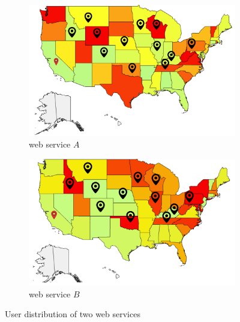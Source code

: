 \begin{figure}[!htb]
   \centering
   \begin{subfigure}{0.4\textwidth}
       \includegraphics[width=\textwidth]{pics/web1.png}
	   \caption{web service $A$}
   \end{subfigure}
   \begin{subfigure}{0.4\textwidth}
       \includegraphics[width=\textwidth]{pics/web2.png}
	   \caption{web service $B$}
   \end{subfigure}
   \caption{User distribution of two web services}
   \label{fig:users}
\end{figure}


